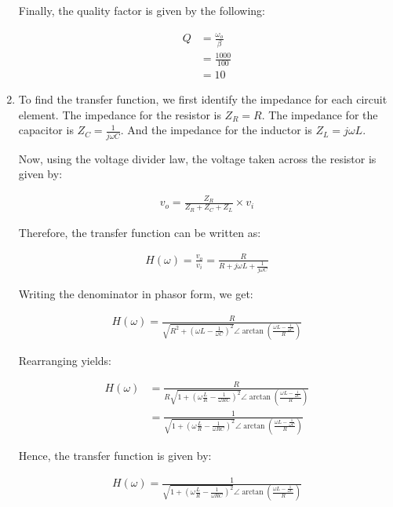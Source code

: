 \documentclass{article}
\begin{document}
\begin{enumerate}
	Finally, the quality factor is given by the following:
	
	\begin{align*}
		Q &= \frac{\omega_o}{\beta} \\
		&= \frac{1000}{100} \\
		&= 10
	\end{align*}
	
	\item
	
	To find the transfer function, we first identify the impedance for each circuit element. The impedance for the resistor is $Z_R = R$. The impedance for the capacitor is $Z_C = \frac{1}{j \omega C}$. And the impedance for the inductor is $Z_L = j \omega L$.
	
	Now, using the voltage divider law, the voltage taken across the resistor is given by:
	
	\begin{align*}
		v_o = \frac{Z_R}{Z_R + Z_C + Z_L} \times v_i
	\end{align*}
	
	Therefore, the transfer function can be written as:
	
	\begin{align*}
		H(\omega) = \frac{v_o}{v_i} = \frac{R}{R + j \omega L + \frac{1}{j \omega C}}
	\end{align*}
	
	Writing the denominator in phasor form, we get:
	
	\begin{align*}
		H(\omega) = \frac{R}{\sqrt{R^2 + (\omega L - \frac{1}{\omega C})^2} \angle \arctan(\frac{\omega L - \frac{1}{\omega C}}{R}) }
	\end{align*}
	
	Rearranging yields:
	
	\begin{align*}
		H(\omega) &= \frac{R}{R \sqrt{1 + (\omega \frac{L}{R} - \frac{1}{\omega RC})^2} \angle \arctan(\frac{\omega L - \frac{1}{\omega C}}{R}) } \\
		&= \frac{1}{\sqrt{1 + (\omega \frac{L}{R} - \frac{1}{\omega RC})^2} \angle \arctan(\frac{\omega L - \frac{1}{\omega C}}{R}) }
	\end{align*}
	
	Hence, the transfer function is given by:
	
	\begin{align*}
		H(\omega) = \frac{1}{\sqrt{1 + (\omega \frac{L}{R} - \frac{1}{\omega RC})^2} \angle \arctan(\frac{\omega L - \frac{1}{\omega C}}{R}) }
	\end{align*}
	

\end{enumerate}
\end{document}
